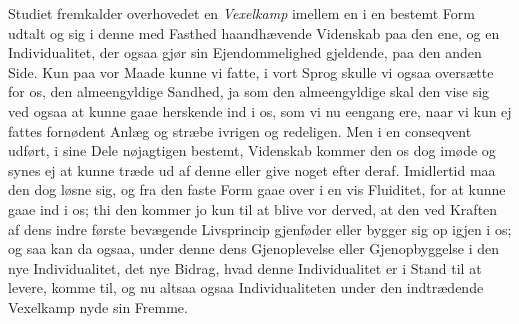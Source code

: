 \documentclass[12pt,a4paper]{book}
\newcommand{\apage}[1]{\marginnote{\footnotesize\textit{[#1]}}}
\begin{document}
Studiet fremkalder overhovedet en \emph{Vexelkamp} imellem en i en bestemt Form udtalt og
sig i denne med Fasthed haandhævende Videnskab paa den ene, og en Individualitet,
der ogsaa gjør sin Ejendommelighed gjeldende, paa den anden Side. Kun paa vor
Maade kunne vi fatte, i vort Sprog skulle vi ogsaa oversætte for os, den
almeengyldige Sandhed, ja som den almeengyldige skal den vise sig ved ogsaa at
kunne gaae herskende ind i os, som vi nu eengang ere, naar vi kun ej fattes
fornødent Anlæg og stræbe ivrigen og redeligen. Men i en conseqvent udført, i sine
Dele nøjagtigen bestemt, Videnskab kommer den os dog imøde og synes ej at kunne
træde ud af denne eller give noget efter deraf. Imidlertid maa den dog løsne sig,
og fra den faste Form gaae over i en vis Fluiditet, for at kunne \apage{189} gaae ind i os; thi
den kommer jo kun til at blive vor derved, at den ved Kraften af dens indre første
bevægende Livsprincip gjenføder eller bygger sig op igjen i os; og saa kan da
ogsaa, under denne dens Gjenoplevelse eller Gjenopbyggelse i den nye
Individualitet, det nye Bidrag, hvad denne Individualitet er i Stand til at levere,
komme til, og nu altsaa ogsaa Individualiteten under den indtrædende Vexelkamp nyde
sin Fremme.
\end{document}

